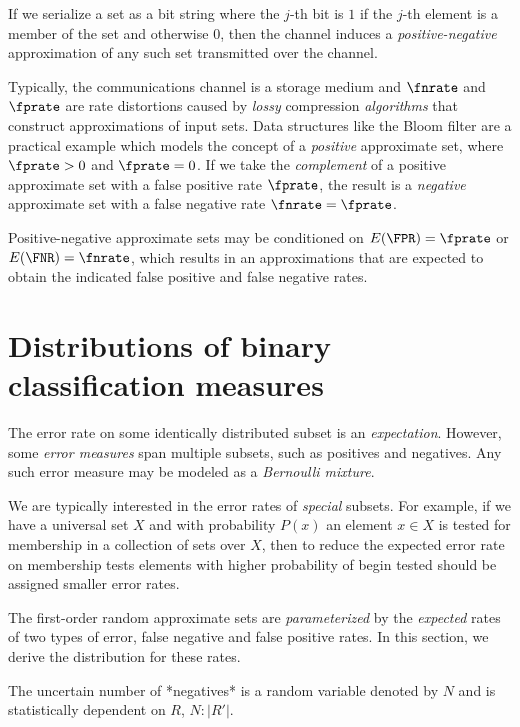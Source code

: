 \documentclass[
]{article}
\begin{document}
If we serialize a set as a bit string where the \(j\)-th bit is \(1\) if
the \(j\)-th element is a member of the set and otherwise \(0\), then
the channel induces a \emph{positive-negative} approximation of any such
set transmitted over the channel.

Typically, the communications channel is a storage medium and
\(\fnrate\) and \(\fprate\) are rate distortions caused by \emph{lossy}
compression \emph{algorithms} that construct approximations of input
sets. Data structures like the Bloom filter are a practical example
which models the concept of a \emph{positive} approximate set, where
\(\fprate > 0\) and \(\fprate = 0\). If we take the \emph{complement} of
a positive approximate set with a false positive rate \(\fprate\), the
result is a \emph{negative} approximate set with a false negative rate
\(\fnrate = \fprate\).

Positive-negative approximate sets may be conditioned on
\(E(\FPR) = \fprate\) or \(E(\FNR) = \fnrate\), which results in an
approximations that are expected to obtain the indicated false positive
and false negative rates.

\hypertarget{sec:characteristics}{%
\section{Distributions of binary classification
measures}\label{sec:characteristics}}

The error rate on some identically distributed subset is an
\emph{expectation}. However, some \emph{error measures} span multiple
subsets, such as positives and negatives. Any such error measure may be
modeled as a \emph{Bernoulli mixture}.

We are typically interested in the error rates of \emph{special}
subsets. For example, if we have a universal set \(X\) and with
probability \(P(x)\) an element \(x \in X\) is tested for membership in
a collection of sets over \(X\), then to reduce the expected error rate
on membership tests elements with higher probability of begin tested
should be assigned smaller error rates.

The first-order random approximate sets are \emph{parameterized} by the
\emph{expected} rates of two types of error, false negative and false
positive rates. In this section, we derive the distribution for these
rates.

\begin{definition}
The uncertain number of *negatives* is a random variable denoted by $N$ and is
statistically dependent on $R$, $N : |R'|$.
\end{definition}
\end{document}
